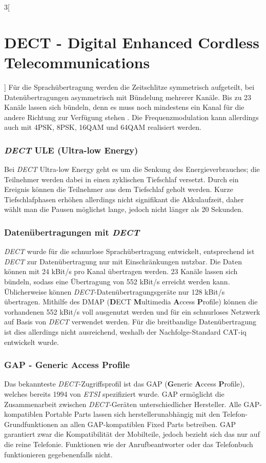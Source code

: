 \begin{multicols}{3}[\section{DECT - Digital Enhanced Cordless Telecommunications}]
Für die Sprachübertragung werden die Zeitschlitze symmetrisch aufgeteilt, bei Datenübertragungen asymmetrisch mit Bündelung mehrerer Kanäle. Bis zu 23 Kanäle lassen sich bündeln, denn es muss noch mindestens ein Kanal für die andere Richtung zur Verfügung stehen \cite{dect.1}.
Die Frequenzmodulation kann allerdings auch mit 4PSK, 8PSK, 16QAM und 64QAM realisiert werden.

\subsubsection*{\textit{DECT} ULE (Ultra-low Energy)}
Bei \textit{DECT} Ultra-low Energy geht es um die Senkung des Energieverbrauches; die Teilnehmer werden dabei in einen zyklischen Tiefschlaf versetzt. Durch ein Ereignis können die Teilnehmer aus dem Tiefschlaf geholt werden. Kurze Tiefschlafphasen erhöhen allerdings nicht signifikant die Akkulaufzeit, daher wählt man die Pausen möglichst lange, jedoch nicht länger als 20 Sekunden. \cite{dect.1}

\subsubsection*{Datenübertragungen mit \textit{DECT}}
\textit{DECT} wurde für die schnurlose Sprachübertragung entwickelt, entsprechend ist \textit{DECT} zur Datenübertragung nur mit Einschränkungen nutzbar. Die Daten können mit 24 kBit/s pro Kanal übertragen werden. 23 Kanäle lassen sich bündeln, sodass eine Übertragung von 552 kBit/s erreicht werden kann. Üblicherweise können \textit{DECT}-Datenübertragungsgeräte nur 128 kBit/s übertragen. Mithilfe des DMAP (\textbf{D}ECT \textbf{M}ultimedia \textbf{A}ccess \textbf{P}rofile) können die vorhandenen 552 kBit/s voll ausgenutzt werden und für ein schnurloses Netzwerk auf Basis von \textit{DECT} verwendet werden. Für die breitbandige Datenübertragung ist dies allerdings nicht ausreichend, weshalb der Nachfolge-Standard CAT-iq entwickelt wurde. \cite{dect.1}

\subsubsection*{GAP - Generic Access Profile}
Das bekannteste \textit{DECT}-Zugriffsprofil ist das GAP (\textbf{G}eneric \textbf{A}ccess \textbf{P}rofile), welches bereits 1994 von \textit{ETSI} spezifiziert wurde. GAP ermöglicht die Zusammenarbeit zwischen \textit{DECT}-Geräten unterschiedlicher Hersteller. Alle GAP-kompatiblen Portable Parts lassen sich herstellerunabhängig mit den Telefon-Grundfunktionen an allen GAP-kompatiblen Fixed Parts betreiben. GAP garantiert zwar die Kompatibilität der Mobilteile, jedoch bezieht sich das nur auf die reine Telefonie. Funktionen wie der Anrufbeantworter oder das Telefonbuch funktionieren gegebenenfalls nicht. \cite{dect.4,dect.1}

\end{multicols}
\newpage
